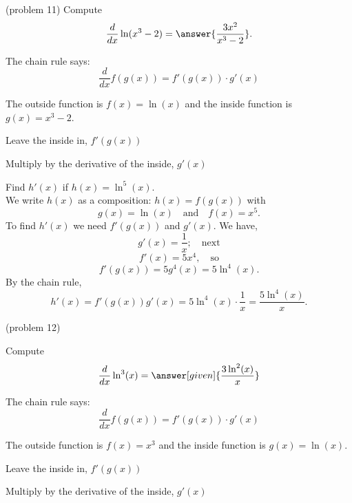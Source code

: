 \documentclass{ximera}
\begin{document}
\begin{problem}(problem 11)
  Compute
  \[
  \frac{d}{dx} \ln(x^3 -2) = \answer{\frac{3x^2}{x^3 - 2}}.
  \]
  
    \begin{hint}
      The chain rule says:
      \[
      \frac{d}{dx} f(g(x)) = f'(g(x))\cdot g'(x)
      \]
    \end{hint}
    \begin{hint}
      The outside function is $f(x) = \ln(x)$ and the inside
      function is $g(x) = x^3 - 2$.
    \end{hint}
    \begin{hint}
		  Leave the inside in, $f'(g(x))$
		\end{hint}
		\begin{hint}
		  Multiply by the derivative of the inside, $g'(x)$
		\end{hint}
		
\end{problem}



\begin{example}[example 12]
Find $h'(x)$ if $h(x) = \ln^5(x)$.\\
We write $h(x)$ as a composition: $h(x)=f(g(x))$ with 
\[g(x) = \ln(x)  \quad \text{and} \quad  f(x) = x^5.\]
 To find $h'(x)$ we need $f'(g(x))$ and $g'(x)$.  We have, 
\[g'(x) = \frac{1}{x}; \quad \text{next} \] 
\[f'(x) = 5x^4, \quad \text{so} \]
\[f'(g(x)) = 5g^4(x) = 5\ln^4(x).\]
By the chain rule,
\[h'(x) = f'(g(x))g'(x) = 5\ln^4(x)\cdot \frac{1}{x}  = \frac{5\ln^4(x)}{x}.\]
\end{example}

\begin{center}
\begin{foldable}
\end{foldable}
\end{center}


\begin{problem}(problem 12)
  
Compute
  \[
  \frac{d}{dx} \ln^3(x) = \answer[given]{\frac{3\ln^2(x)}{x}}
  \]
  
    \begin{hint}
      The chain rule says:
      \[
      \frac{d}{dx} f(g(x)) = f'(g(x))\cdot g'(x)
      \]
    \end{hint}
    \begin{hint}
      The outside function is $f(x) = x^3$ and the inside
      function is $g(x) = \ln(x)$.
    \end{hint}
    \begin{hint}
		  Leave the inside in, $f'(g(x))$
		\end{hint}
		\begin{hint}
		  Multiply by the derivative of the inside, $g'(x)$
		\end{hint}
		
\end{problem}
\end{document}
